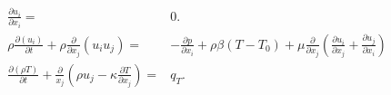     \begin{align}
      \frac{\partial u_i}{\partial x_i} =& 0. \\
        \rho \frac{\partial \left( u_i \right)}{\partial t} 
        + \rho \frac{\partial}{\partial x_j} \left( u_i  u_j \right) 
        =& - \frac{\partial p}{\partial x_i} 
        + \rho \beta \left( T - T_0 \right)
        +  \mu \frac{\partial}{\partial x_j} \left( \frac{\partial u_i}{\partial x_j} 
                                             + \frac{\partial u_j}{\partial x_i} \right) \\
    \frac{\partial \left(\rho T \right)}{\partial t} + \frac{\partial}{x_j} \left( \rho u_j - \kappa \frac{\partial T}{\partial x_j} \right) =& q_T.
    \end{align}

